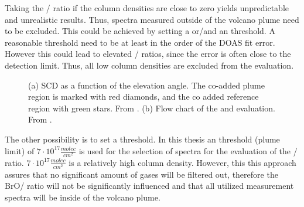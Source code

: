 %
Taking the / ratio if the column densities are close to zero yields unpredictable and unrealistic results. Thus, spectra measured outside of the volcano plume need to be excluded.
This could be achieved by setting a  or/and an  threshold. A reasonable  threshold need to be at least in the order of the DOAS fit error. However this could lead to elevated / ratios, since the  error is often close to the detection limit. Thus, all low  column densities are excluded from the evaluation.
%
\begin{figure}
	\caption{(a)  SCD as a function of the elevation angle. The co-added plume region is marked with red diamonds, and the co added reference region with green stars. From \cite{WarnachSimon}. (b) Flow chart of the   and  evaluation. From \cite{lubcke2014optical}.}
	\label{fig:algorithm}
\end{figure}
The other possibility is to set a  threshold. In this thesis an  threshold (plume limit) of $7\cdot 10^{17} \frac{molec}{cm^2}$ is used for the selection of spectra for the evaluation of the / ratio. $7\cdot 10^{17} \frac{molec}{cm^2}$ is a relatively high column density. However, this this approach assures that no significant amount of gases will be filtered out, therefore the BrO/ ratio will not be significantly influenced \citep{lubcke2014bro} and that all utilized measurement spectra will be inside of the volcano plume. 
